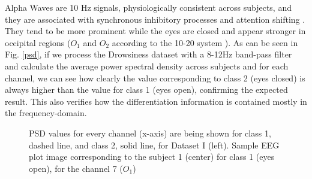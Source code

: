    
Alpha Waves are 10 Hz signals, physiologically consistent across subjects, and they are associated with synchronous inhibitory processes and attention shifting \cite{c3}. They tend to be more prominent while the eyes are closed and appear stronger in occipital regions ($O_1$ and $O_2$ according to the 10-20 system \cite{c6,c11}). As can be seen in Fig. \ref{psd}, if we process the Drowsiness dataset with a 8-12Hz band-pass filter and calculate the average power spectral density across subjects and for each channel, we can see how clearly the value corresponding to class 2 (eyes closed) is always higher than the value for class 1 (eyes open), confirming the expected result.  This also verifies how the differentiation information is contained mostly in the frequency-domain.



   \begin{figure}[thpb]
      \centering
      \setlength\fboxsep{0pt}
	  \setlength\fboxrule{0.5pt}
      \caption{PSD values for every channel (x-axis) are being shown for class 1, dashed line, and class 2, solid line, for Dataset I (left). Sample EEG plot image corresponding to the subject 1 (center) for class 1 (eyes open), for the channel 7 ($ O_1 $) }
      \label{figure1}
   \end{figure}
   
